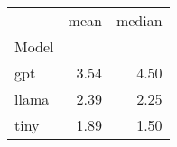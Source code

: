 \begin{tabular}{lrr}
\toprule
 & mean & median \\
Model &  &  \\
\midrule
gpt & 3.54 & 4.50 \\
llama & 2.39 & 2.25 \\
tiny & 1.89 & 1.50 \\
\bottomrule
\end{tabular}

